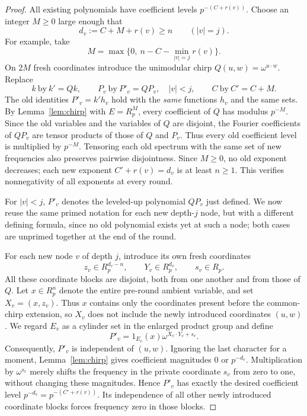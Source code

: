 \documentclass[11pt]{amsart}
\theoremstyle{definition}
\theoremstyle{remark}
\newcommand{\R}{R}
\begin{document}
\begin{proof}
All existing polynomials have coefficient levels
\(p^{-(C+r(v))}\). Choose an integer \(M\geq0\) large enough that
\begin{equation}
 d_v:=C+M+r(v)\geq n\qquad (|v|=j).
\end{equation}
For example, take
\[
 M=\max\bigl\{0,\ n-C-\min_{|v|=j}r(v)\bigr\}.
\]
On \(2M\) fresh coordinates introduce the unimodular chirp
\(Q(u,w)=\omega^{u\cdot w}\). Replace
\[
 k\ \text{by}\ k'=Qk,\qquad
 P_v\ \text{by}\ P'_v=QP_v,\quad |v|<j,
 \qquad C\ \text{by}\ C'=C+M.
\]
The old identities \(P'_v=k'h_v\) hold with the \emph{same}
functions \(h_v\) and the same sets. By Lemma~\ref{lem:chirp} with
\(E=\R_p^M\), every coefficient of \(Q\) has modulus \(p^{-M}\).
Since the old variables and the variables of \(Q\) are disjoint,
the Fourier coefficients of \(QP_v\) are tensor products of those
of \(Q\) and \(P_v\). Thus every old coefficient level is multiplied
by \(p^{-M}\). Tensoring each old spectrum with the same set of new
frequencies also preserves pairwise disjointness.
Since \(M\geq0\), no old exponent decreases; each new exponent
\(C'+r(v)=d_v\) is at least \(n\geq1\).
This verifies nonnegativity of all exponents at every round.

For \(|v|<j\), \(P'_v\) denotes the leveled-up polynomial \(QP_v\)
just defined. We now reuse the same primed notation for each new
depth-\(j\) node, but with a different defining formula, since no
old polynomial exists yet at such a node; both cases are unprimed
together at the end of the round.

For each new node \(v\) of depth \(j\), introduce its own fresh
coordinates
\[
 z_v\in\R_p^{d_v-n},\qquad
 Y_v\in\R_p^{d_v},\qquad s_v\in\R_p.
\]
All these coordinate blocks are disjoint, both from one another
and from those of \(Q\). Let \(x\in\R_p^n\) denote the entire
pre-round ambient variable, and set \(X_v=(x,z_v)\). Thus \(x\)
contains only the coordinates present before the common-chirp extension,
so \(X_v\) does not include the newly introduced coordinates \((u,w)\).
 We regard \(E_v\)
as a cylinder set in the enlarged product group and define
\begin{equation}
 P'_v=1_{E_v}(x)\omega^{X_v\cdot Y_v+s_v}.
\end{equation}
Consequently, \(P'_v\) is independent of \((u,w)\).
Ignoring the last character for a moment, Lemma~\ref{lem:chirp}
gives coefficient magnitudes \(0\) or \(p^{-d_v}\). Multiplication by
\(\omega^{s_v}\) merely shifts the frequency in the private coordinate
\(s_v\) from zero to one, without changing these magnitudes. Hence
\(P'_v\) has exactly the desired coefficient level
\(p^{-d_v}=p^{-(C'+r(v))}\). Its independence of all other newly
introduced coordinate blocks forces frequency zero in those blocks.



\end{proof}
\end{document}
